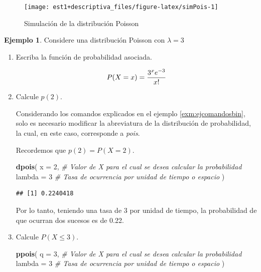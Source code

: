 \documentclass[
  11pt,
]{book}
\newenvironment{Shaded}{\begin{snugshade}}{\end{snugshade}}
\newcommand{\AttributeTok}[1]{\textcolor[rgb]{0.13,0.29,0.53}{#1}}
\newcommand{\CommentTok}[1]{\textcolor[rgb]{0.56,0.35,0.01}{\textit{#1}}}
\newcommand{\DecValTok}[1]{\textcolor[rgb]{0.00,0.00,0.81}{#1}}
\newcommand{\FunctionTok}[1]{\textcolor[rgb]{0.13,0.29,0.53}{\textbf{#1}}}
\newcommand{\NormalTok}[1]{#1}
\theoremstyle{definition}
\theoremstyle{definition}
\newtheorem{example}{Ejemplo}[chapter]
\theoremstyle{definition}
\theoremstyle{definition}
\theoremstyle{remark}
\begin{document}
\begin{figure}

{\centering \texttt{[image: est1+descriptiva\_files/figure-latex/simPois-1]} 

}

\caption{Simulación de la distribución Poisson}\label{fig:simPois}
\end{figure}

\begin{example}

Considere una distribución Poisson con \(\lambda = 3\)

\begin{enumerate}
\def\labelenumi{\alph{enumi}.}
\item
  Escriba la función de probabilidad asociada.

  \begin{equation}
  \notag
  P(X=x) = \dfrac{3^xe^{-3}}{x!}
  \end{equation}
\item
  Calcule \(p(2)\).

  Considerando los comandos explicados en el ejemplo \ref{exm:ejcomandosbin}, solo es necesario modificar la abreviatura de la distribución de probabilidad, la cual, en este caso, corresponde a \emph{pois}.

  Recordemos que \(p(2) = P(X = 2)\).

\begin{Shaded}
\begin{Highlighting}[]
\FunctionTok{dpois}\NormalTok{(}
  \AttributeTok{x =} \DecValTok{2}\NormalTok{, }\CommentTok{\# Valor de X para el cual se desea calcular la probabilidad}
  \AttributeTok{lambda =} \DecValTok{3} \CommentTok{\# Tasa de ocurrencia por unidad de tiempo o espacio}
\NormalTok{  )}
\end{Highlighting}
\end{Shaded}

\begin{verbatim}
## [1] 0.2240418
\end{verbatim}

  Por lo tanto, teniendo una tasa de 3 por unidad de tiempo, la probabilidad de que ocurran dos sucesos es de 0.22.
\item
  Calcule \(P(X\leq 3)\).

\begin{Shaded}
\begin{Highlighting}[]
\FunctionTok{ppois}\NormalTok{(}
  \AttributeTok{q =} \DecValTok{3}\NormalTok{, }\CommentTok{\# Valor de X para el cual se desea calcular la probabilidad}
  \AttributeTok{lambda =} \DecValTok{3} \CommentTok{\# Tasa de ocurrencia por unidad de tiempo o espacio}
\NormalTok{  )}
\end{Highlighting}
\end{Shaded}


\end{enumerate}
\end{example}
\end{document}
